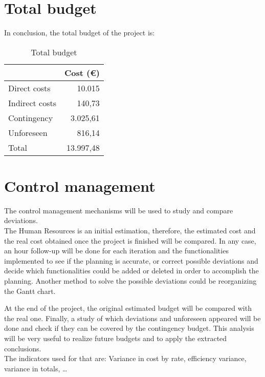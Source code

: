 \section{Total budget}
In conclusion, the total budget of the project is:
\begin{table}[h!]
	\centering
	\begin{tabular}{l|r|}
		\cline{2-2}
		& \multicolumn{1}{l|}{Cost (€)} \\ \hline
		\multicolumn{1}{|l|}{Direct costs} & 10.015\\ \hline
		\multicolumn{1}{|l|}{Indirect costs}& 140,73\\ \hline
		\multicolumn{1}{|l|}{Contingency} & 3.025,61\\ \hline
		\multicolumn{1}{|l|}{Unforeseen} & 816,14\\ \hline\hline
		\multicolumn{1}{|l|}{Total} & 13.997,48\\ \hline
	\end{tabular}
	\caption{Total budget}
	\label{TotalBudget}
\end{table}
\section{Control management}
The control management mechanisms will be used to study and compare deviations.\\

The Human Resources is an initial estimation, therefore, the estimated cost and the real cost obtained once the project is finished will be compared. In any case, an hour follow-up will be done for each iteration and the functionalities implemented to see if the planning is accurate, or correct possible deviations and decide which functionalities could be added or deleted in order to accomplish the planning. Another method to solve the possible deviations could be reorganizing the Gantt chart. 

At the end of the project, the original estimated budget will be compared with the real one. Finally, a study of which deviations and unforeseen appeared will be done and check if they can be covered by the contingency budget. This analysis will be very useful to realize future budgets and to apply the extracted conclusions. \\

The indicators used for that are: Variance in cost by rate, efficiency variance, variance in totals, \ldots